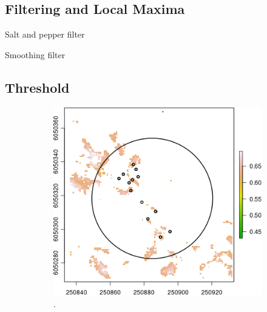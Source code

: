 \documentclass{subfiles}
\begin{document}
 
 \subsection{Filtering and Local Maxima}
 \par Salt and pepper filter
 \par Smoothing filter 
 

 

 
 
 \subsection{Threshold}
  \begin{figure} [h!]			
  	\begin{subfigure}[t]{.49\textwidth}
  		
  		\centering
  		\includegraphics[width=\textwidth]{img/dead/c8_thresDead}
  		\caption{.}
  		\label{fig:c8_deadThres}
  	\end{subfigure} \hfill
  	\begin{subfigure}[t]{.49\textwidth}
  		\centering

\end{subfigure}
\end{figure}
\end{document}
